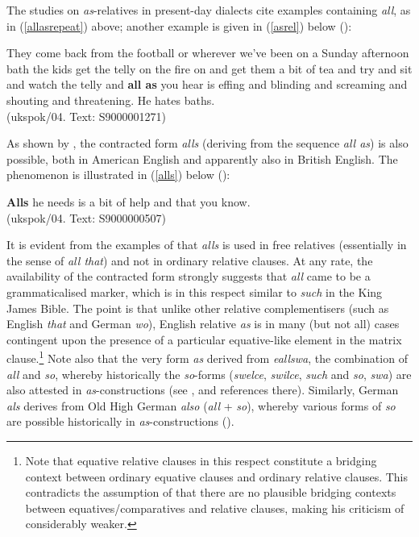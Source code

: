 The studies on \textit{as}-relatives in present-day dialects cite examples containing \textit{all}, as in (\ref{allasrepeat}) above; another example is given in (\ref{asrel}) below (\citealt[72, ex. 8]{kjellmer2008}):

\ea They come back from the football or wherever we've been on a Sunday afternoon bath the kids get the telly on the fire on and get them a bit of tea and try
and sit and watch the telly and \textbf{all as} you hear is effing and blinding and screaming and shouting and threatening. He hates baths.\\(ukspok/04. Text: S9000001271) \label{asrel}
\z

As shown by \citet{kjellmer2008}, the contracted form \textit{alls} (deriving from the sequence \textit{all as}) is also possible, both in American English and apparently also in British English. The phenomenon is illustrated in (\ref{alls}) below (\citealt[69, ex. 3]{kjellmer2008}):

\ea \textbf{Alls} he needs is a bit of help and that you know.\\(ukspok/04. Text: S9000000507) \label{alls}
\z

It is evident from the examples of \citet{kjellmer2008} that \textit{alls} is used in free relatives (essentially in the sense of \textit{all that}) and not in ordinary relative clauses. At any rate, the availability of the contracted form strongly suggests that \textit{all} came to be a grammaticalised marker, which is in this respect similar to \textit{such} in the King James Bible. The point is that unlike other relative complementisers (such as English \textit{that} and German \textit{wo}), English relative \textit{as} is in many (but not all) cases contingent upon the presence of a particular equative-like element in the matrix clause.\footnote{Note that equative relative clauses in this respect constitute a bridging context between ordinary equative clauses and ordinary relative clauses. This contradicts the assumption of \citet[54]{koenig2015} that there are no plausible bridging contexts between equatives/comparatives and relative clauses, making his criticism of \citet{brandnerbraeuning2013} considerably weaker.} Note also that the very form \textit{as} derived from \textit{eallswa}, the combination of \textit{all} and \textit{so}, whereby historically the \textit{so}-forms (\textit{swelce}, \textit{swilce}, \textit{such} and \textit{so}, \textit{swa}) are also attested in \textit{as}-constructions (see \citealt[315--317]{kortmann1997}, \citealt[312--314]{lopezcousomendeznaya2014} and references there). Similarly, German \textit{als} derives from Old High German \textit{also} (\textit{all} + \textit{so}), whereby various forms of \textit{so} are possible historically in \textit{as}-constructions (\citealt{jaeger2010}).

